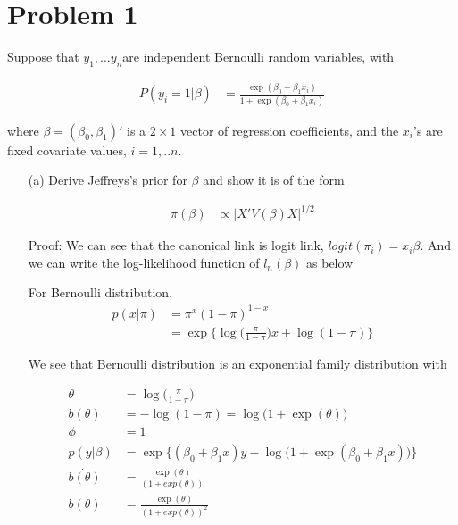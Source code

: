 
\section{Problem 1}
Suppose that $y_1,… y_n $are independent Bernoulli random variables, with
 
\begin{align*}
	P(y_i=1| \beta)&= \frac{\exp{(\beta_0 + \beta_1 x_i)}}{1 + \exp (\beta_0 + \beta_1 x_i)}
\end{align*}

where $\beta = (\beta_0, \beta_1)'$ is a $2 \times 1$ vector of regression coefficients, and the $x_i$'s are fixed covariate values, $i= 1,.. n$.

\begin{itemize}
	\item [(a)] Derive Jeffreys's prior for $\beta$ and show it is of the form  
	
\begin{align*}
	\pi(\beta) & \propto | X' V(\beta) X |^{1/2}
\end{align*}	
	
Proof: We can see that the canonical link is logit link, $logit(\pi_i) = x_i \beta$. And we can write the log-likelihood function of $l_n(\beta)$ as below

For Bernoulli distribution,
\begin{align*}
p(x| \pi) &= \pi^{x} (1- \pi)^{1-x} \\
&= \exp \{ \log \Big( \frac{\pi}{1- \pi} \Big) x + \log (1 - \pi) \}
\end{align*}

We see that Bernoulli distribution is an exponential family distribution with 

\begin{align*}
\theta &= \log \Big( \frac{\pi}{1- \pi} \Big) \\
b(\theta)&=- \log (1 - \pi) =  \log \Big( 1 + \exp(\theta) \Big)  \\
\phi & = 1\\
p( y | \beta) &= \exp \{  (\beta_0 + \beta_1 x) y -\log \Big( 1 + \exp(\beta_0 + \beta_1 x) \Big)  \}\\
\dot{b(\theta)} &= \frac{\exp(\theta)}{(1 + exp(\theta))}\\
\ddot{b(\theta)} &= \frac{\exp(\theta)}{(1 + exp(\theta))^2}
\end{align*}


\end{itemize}
